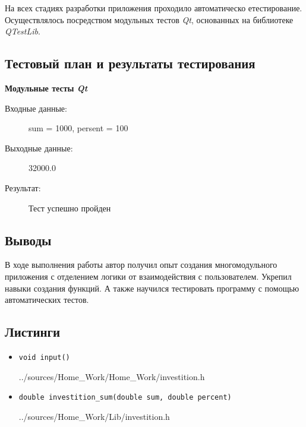 \documentclass[12pt,a4paper]{report}
\begin{document}
На всех стадиях разработки приложения проходило автоматическо етестирование. Осуществлялось посредством модульных тестов \textit{Qt}, основанных на библиотеке  \textit{QTestLib}. 

\subsection{Тестовый план и результаты тестирования}
\item \textbf{Модульные тесты \textit{Qt}}
\begin{description}
\hspace{\parindent}
\begin{flushleft}
\begin{description}
\item[Входные данные:] sum = 1000, persent = 100
\item[Выходные данные:] 32000.0
\item[Результат:] Тест успешно пройден
\end{description}
\end{flushleft}
\end{description}

\subsection{Выводы}
\hspace{\parindent}
В ходе выполнения работы автор получил опыт создания многомодульного приложения с отделением логики от взаимодействия с пользователем. Укрепил навыки создания функций. А также научился тестировать программу с помощью автоматических тестов.

\subsection*{Листинги}
\begin{itemize}
\item[] \verb-void input()-

{../sources/Home_Work/Home_Work/investition.h}
\item[] \verb-double investition_sum(double sum, double percent)-

{../sources/Home_Work/Lib/investition.h}
\end{itemize}
%
\end{document}
